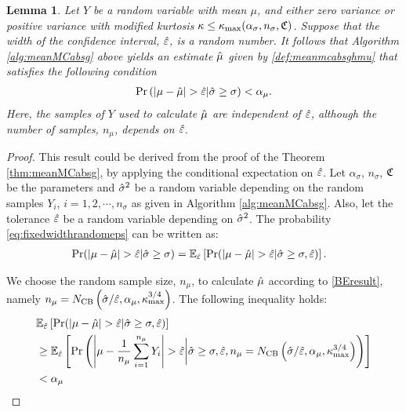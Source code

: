 \documentclass{iitthesis}
\newtheorem{lemma}[theorem]{Lemma}
\theoremstyle{definition}
\begin{document}
\begin{lemma}\label{thm:fixedwidthrandomeps}
Let $Y$ be a random variable with mean $\mu$, and either zero variance or positive variance with modified kurtosis $\kappa \leq \kappa_{\max}(\alpha_\sigma, n_\sigma, \mathfrak{C})$. Suppose that the width of the confidence interval, $\hat{\varepsilon}$, is a random number. It follows that Algorithm \ref{alg:meanMCabsg} above yields an estimate $\hat{\mu}$ given by \eqref{def:meanmcabsghmu} that satisfies the following condition
\begin{align}\label{eq:fixedwidthrandomeps}
\Pr\left( \left \lvert \mu-\hat{\mu} \right \rvert > \hat{\varepsilon} |\hat{\sigma} \geq \sigma \right) <\alpha_\mu.
\end{align}
Here, the samples of $Y$ used to calculate $\hat{\mu}$ are independent of $\hat{\varepsilon}$, although the number of samples, $n_\mu$, depends on $\hat{\varepsilon}$.
\end{lemma}
\begin{proof}
This result could be derived from the proof of the Theorem \ref{thm:meanMCabsg}, by applying the conditional expectation on $\hat{\varepsilon}$.
Let $\alpha_\sigma$, $n_\sigma$, $\mathfrak{C}$ be the parameters and $\hat{\sigma}^2$ be a random variable depending on the random samples $Y_i$, $i = 1,2,\cdots, n_{\sigma}$ as given in Algorithm \ref{alg:meanMCabsg}. Also, let the tolerance $\hat{\varepsilon}$ be a random variable depending on $\hat{\sigma}^2$. 
The probability \eqref{eq:fixedwidthrandomeps} can be written as:
\begin{align}
&\Pr(\left \lvert \mu-\hat{\mu} \right \rvert > \hat{\varepsilon}|\hat{\sigma} \geq \sigma) = \mathbb{E}_{\hat{\varepsilon}}\left[\Pr({\left \lvert \mu-\hat{\mu} \right \rvert  > \hat{\varepsilon}}| \hat{\sigma}\geq\sigma , \hat{\varepsilon})\right].
\end{align}

We choose the random sample size, $n_\mu$, to calculate $\hat{\mu}$ according to \eqref{BEresult}, namely $n_\mu= N_{\operatorname{CB}}\left(\hat{\sigma}/\hat{\varepsilon},\alpha_\mu, \kappa_{\max}^{3/4}\right)$. 
The following inequality holds:
\begin{align*}
&\mathbb{E}_{\hat{\varepsilon}}\left[\Pr({\left \lvert \mu-\hat{\mu} \right \rvert  > \hat{\varepsilon}}| \hat{\sigma}\geq\sigma , \hat{\varepsilon})\right]\\
&\geq \mathbb{E}_{\hat{\varepsilon}}\left[\Pr\left({\left \lvert \mu-\frac{1}{n_\mu}\sum_{i=1}^{n_\mu}Y_i \right \rvert > \hat{\varepsilon}}\bigg \vert \hat{\sigma}\geq\sigma , \hat{\varepsilon}, n_\mu= N_{\operatorname{CB}}\left(\hat{\sigma}/\hat{\varepsilon},\alpha_\mu, \kappa_{\max}^{3/4}\right)\right)\right]\\
&<\alpha_\mu
\end{align*}
\end{proof}
\end{document}

